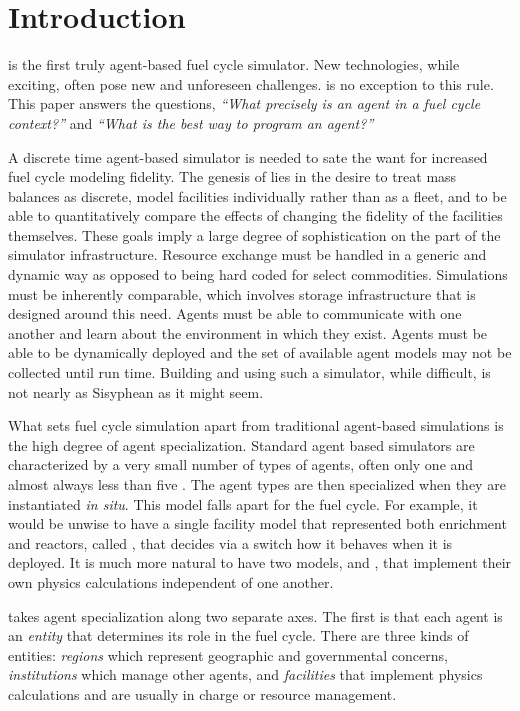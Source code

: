 \section{Introduction}
\label{sec-intro}

\Cyclus \citeme is the first truly agent-based \citeme fuel cycle simulator. 
New technologies, while exciting, often pose new and unforeseen challenges.
\Cyclus is no exception to this rule.  This paper answers the questions,
\emph{``What precisely is an agent in a fuel cycle context?''} and 
\emph{``What is the best way to program an agent?''}

A discrete time agent-based simulator is needed to sate the want for increased 
fuel cycle modeling fidelity. The genesis of \cyclus lies in the desire to 
treat mass balances as discrete, model facilities individually rather than as 
a fleet, and to be able to quantitatively compare the effects of changing the 
fidelity of the facilities themselves. These goals imply a large degree of 
sophistication on the part of the simulator infrastructure.  Resource exchange
must be handled in a generic and dynamic way as opposed to being hard coded 
for select commodities. Simulations must be inherently comparable, which involves 
storage infrastructure that is designed around this need. Agents must be able 
to communicate with one another and learn about the environment in which they 
exist. Agents must be able to be dynamically deployed and the set of 
available agent models may not be collected until run time. Building and using such a
simulator, while difficult, is not nearly as Sisyphean as it might seem. 

What sets fuel cycle simulation apart from traditional agent-based simulations 
is the high degree of agent specialization. Standard agent based simulators
are characterized by a very small number of types of agents, often only one and 
almost always less than five \citeme. The agent types are then specialized 
when they are instantiated \emph{in situ}. This model falls apart for the 
fuel cycle.  For example, it would be unwise to have a single facility model 
that represented both enrichment and reactors, called ,
that decides via a switch how it behaves when it is deployed. It is much 
more natural to have two models,  and , 
that implement their own physics calculations independent of one another.

\Cyclus takes agent specialization along two separate axes. The first is 
that each agent is an \emph{entity} that determines its role in the 
fuel cycle. There are three kinds of entities: \emph{regions} which 
represent geographic and governmental concerns, \emph{institutions} 
which manage other agents, and \emph{facilities} that implement 
physics calculations and are usually in charge or resource management.

